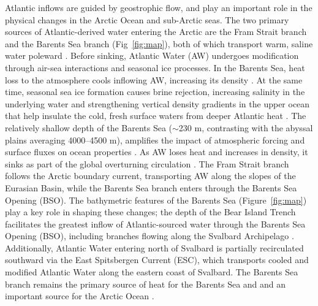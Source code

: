 \documentclass[draft]{agujournal2019}
\begin{document}
Atlantic inflows are guided by geostrophic flow, and play an important role in the physical changes in the Arctic Ocean and sub-Arctic seas. The two primary sources of Atlantic-derived water entering the Arctic are the Fram Strait branch and the Barents Sea branch (Fig~\ref{fig:map}), both of which transport warm, saline water poleward \cite{schauer1997,Rudels2008}. Before sinking, Atlantic Water (AW) undergoes modification through air-sea interactions and seasonal ice processes. In the Barents Sea, heat loss to the atmosphere cools inflowing AW, increasing its density \cite{arthun2010}. At the same time, seasonal sea ice formation causes brine rejection, increasing salinity in the underlying water and strengthening vertical density gradients in the upper ocean that help insulate the cold, fresh surface waters from deeper Atlantic heat \cite{schauer2002}. The relatively shallow depth of the Barents Sea ($\sim$230 m, contrasting with the abyssal plains averaging 4000--4500 m), amplifies the impact of atmospheric forcing and surface fluxes on ocean properties \cite{Loeng1991,Rudels2022}. As AW loses heat and increases in density, it sinks as part of the global overturning circulation \cite{Vallis2006}. The Fram Strait branch follows the Arctic boundary current, transporting AW along the slopes of the Eurasian Basin, while the Barents Sea branch enters through the Barents Sea Opening (BSO). The bathymetric features of the Barents Sea (Figure~\ref{fig:map}) play a key role in shaping these changes; the depth of the Bear Island Trench facilitates the greatest inflow of Atlantic-sourced water through the Barents Sea Opening (BSO), including branches flowing along the Svalbard Archipelago \cite{Kalhagen2024}. Additionally, Atlantic Water entering north of Svalbard \cite{Lind2012,Lundesgaard2022} is partially recirculated southward via the East Spitsbergen Current (ESC), which transports cooled and modified Atlantic Water along the eastern coast of Svalbard. The Barents Sea branch remains the primary source of heat for the Barents Sea and and an important source for the Arctic Ocean \cite{Lien_Trofimov_2013,Kalhagen2024}.
\end{document}
